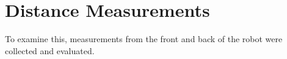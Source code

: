 \section{Distance Measurements}
\label{sec:04_distance}

To examine this, measurements from the front and back of the robot were
collected and evaluated.